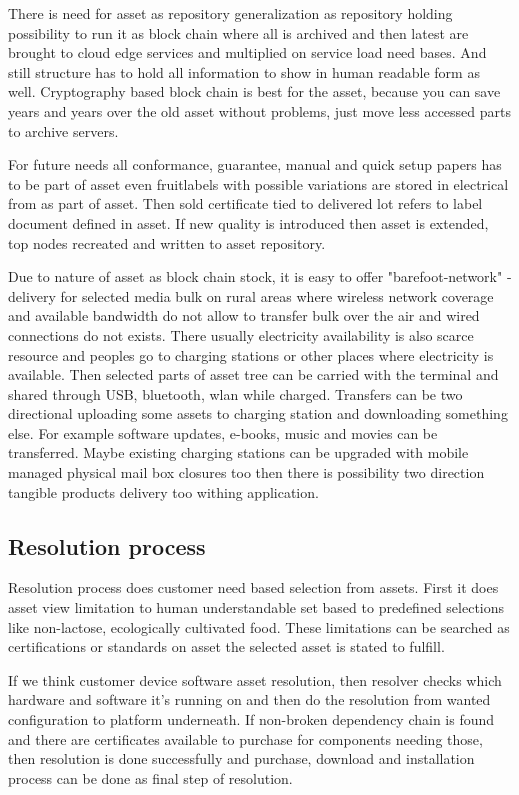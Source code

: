 There is need for asset as repository generalization as repository holding possibility to run it as block chain where all is archived and then latest are brought to cloud edge services and multiplied on service load need bases. And still structure has to hold all information to show in human readable form as well. Cryptography based block chain is best for the asset, because you can save years and years over the old asset without problems, just move less accessed parts to archive servers.

For future needs all conformance, guarantee, manual and quick setup papers has to be part of asset even fruitlabels with possible variations are stored in electrical from as part of asset. Then sold certificate tied to delivered lot refers to label document defined in asset. If new quality is introduced then asset is extended, top nodes recreated and written to asset repository.

Due to nature of asset as block chain stock, it is easy to offer "barefoot-network" -delivery for selected media bulk on rural areas where wireless network coverage and available bandwidth do not allow to transfer bulk over the air and wired connections do not exists. There usually electricity availability is also scarce resource and peoples go to charging stations or other places where electricity is available. Then selected parts of asset tree can be carried with the terminal and shared through USB, bluetooth, wlan while charged. Transfers can be two directional uploading some assets to charging station and downloading something else. For example software updates, e-books, music and movies can be transferred. Maybe existing charging stations can be upgraded with mobile managed physical mail box closures too then there is possibility two direction tangible products delivery too withing application.

\subsection{Resolution process}
\label{resolution}

Resolution process does customer need based selection from assets. First it does asset view limitation to human understandable set based to predefined selections like non-lactose, ecologically cultivated food. These limitations can be searched as certifications or standards on asset the selected asset is stated to fulfill.  

If we think customer device software asset resolution, then resolver checks which hardware and software it's running on and then do the resolution from wanted configuration to platform underneath. If non-broken dependency chain is found and there are certificates available to purchase for components needing those, then resolution is done successfully and purchase, download and installation process can be done as final step of resolution.  

